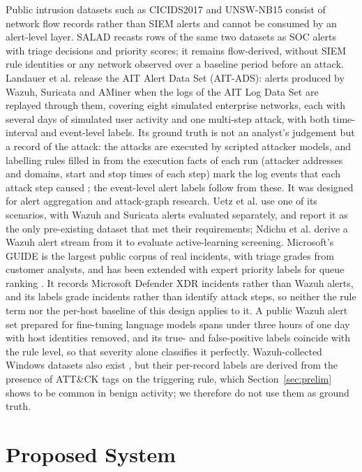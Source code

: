 \documentclass[conference]{IEEEtran}
\begin{document}
Public intrusion datasets such as CICIDS2017 and UNSW-NB15 consist of network flow records rather than SIEM alerts and cannot be consumed by an alert-level layer. SALAD \cite{ref30} recasts rows of the same two datasets as SOC alerts with triage decisions and priority scores; it remains flow-derived, without SIEM rule identities or any network observed over a baseline period before an attack. Landauer et al. \cite{ref21} release the AIT Alert Data Set (AIT-ADS): alerts produced by Wazuh, Suricata and AMiner when the logs of the AIT Log Data Set \cite{ref22} are replayed through them, covering eight simulated enterprise networks, each with several days of simulated user activity and one multi-step attack, with both time-interval and event-level labels. Its ground truth is not an analyst's judgement but a record of the attack: the attacks are executed by scripted attacker models, and labelling rules filled in from the execution facts of each run (attacker addresses and domains, start and stop times of each step) mark the log events that each attack step caused \cite{ref22}; the event-level alert labels follow from these. It was designed for alert aggregation and attack-graph research. Uetz et al. \cite{ref26} use one of its scenarios, with Wazuh and Suricata alerts evaluated separately, and report it as the only pre-existing dataset that met their requirements; Ndichu et al. \cite{ref27} derive a Wazuh alert stream from it to evaluate active-learning screening. Microsoft's GUIDE \cite{ref28} is the largest public corpus of real incidents, with triage grades from customer analysts, and has been extended with expert priority labels for queue ranking \cite{ref29}. It records Microsoft Defender XDR incidents rather than Wazuh alerts, and its labels grade incidents rather than identify attack steps, so neither the rule term nor the per-host baseline of this design applies to it. A public Wazuh alert set prepared for fine-tuning language models \cite{ref31} spans under three hours of one day with host identities removed, and its true- and false-positive labels coincide with the rule level, so that severity alone classifies it perfectly. Wazuh-collected Windows datasets also exist \cite{ref23}, but their per-record labels are derived from the presence of ATT\&CK tags on the triggering rule, which Section~\ref{sec:prelim} shows to be common in benign activity; we therefore do not use them as ground truth.

\section{Proposed System}
\label{sec:system}
\end{document}
